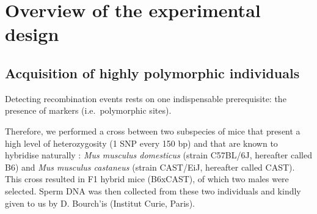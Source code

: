%
%
%
%
%


\section{Overview of the experimental design}
\subsection{Acquisition of highly polymorphic individuals}

Detecting recombination events rests on one indispensable prerequisite: the presence of markers (i.e.\ polymorphic sites).

Therefore, we performed a cross between two subspecies of mice that present a high level of heterozygosity (1 SNP every 150 bp) \citep{keane2011mouse,yalcin2012nextgeneration} and that are known to hybridise naturally \citep{orth1998natural}: \textit{Mus musculus domesticus} (strain C57BL/6J, hereafter called B6) and \textit{Mus musculus castaneus} (strain CAST/EiJ, hereafter called CAST).
This cross resulted in F1 hybrid mice (B6xCAST), of which two males were selected. 
Sperm DNA was then collected from these two individuals and kindly given to us by D. Bourch'is (Institut Curie, Paris).

